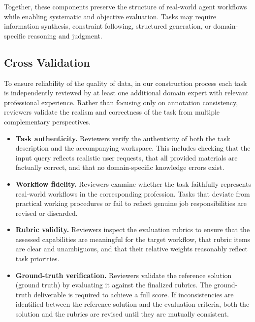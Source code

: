 Together, these components preserve the structure of real-world agent workflows while enabling systematic and objective evaluation. Tasks may require information synthesis, constraint following, structured generation, or domain-specific reasoning and judgment.


\subsection{Cross Validation}
\label{app:cross_valid}


To ensure reliability of the quality of data, in our construction process each task is independently reviewed by at least one additional domain expert with relevant professional experience. Rather than focusing only on annotation consistency, reviewers validate the realism and correctness of the task from multiple complementary perspectives.

\begin{itemize} \item \textbf{Task authenticity.} Reviewers verify the authenticity of both the task description and the accompanying workspace. This includes checking that the input query reflects realistic user requests, that all provided materials are factually correct, and that no domain-specific knowledge errors exist.

\item \textbf{Workflow fidelity.} Reviewers examine whether the task faithfully represents real-world workflows in the corresponding profession. Tasks that deviate from practical working procedures or fail to reflect genuine job responsibilities are revised or discarded.

\item \textbf{Rubric validity.} Reviewers inspect the evaluation rubrics to ensure that the assessed capabilities are meaningful for the target workflow, that rubric items are clear and unambiguous, and that their relative weights reasonably reflect task priorities.

\item \textbf{Ground-truth verification.} Reviewers validate the reference solution (ground truth) by evaluating it against the finalized rubrics. The ground-truth deliverable is required to achieve a full score. If inconsistencies are identified between the reference solution and the evaluation criteria, both the solution and the rubrics are revised until they are mutually consistent. \end{itemize}

